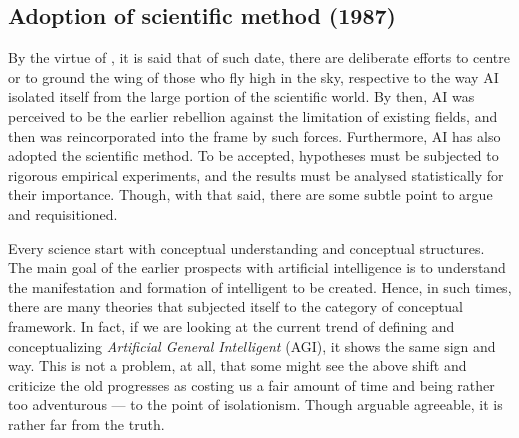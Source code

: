 \subsection{Adoption of scientific method (1987)}

By the virtue of \cite{10.5555/1671238}, it is said that of such date, there are deliberate efforts to centre or to ground the wing of those who fly high in the sky, respective to the way AI isolated itself from the large portion of the scientific world. By then, AI was perceived to be the earlier rebellion against the limitation of existing fields, and then was reincorporated into the frame by such forces. Furthermore, AI has also adopted the scientific method. To be accepted, hypotheses must be subjected to rigorous empirical experiments, and the results must be analysed statistically for their importance. Though, with that said, there are some subtle point to argue and requisitioned. 

Every science start with conceptual understanding and conceptual structures. The main goal of the earlier prospects with artificial intelligence is to understand the manifestation and formation of intelligent to be created. Hence, in such times, there are many theories that subjected itself to the category of conceptual framework. In fact, if we are looking at the current trend of defining and conceptualizing \textit{Artificial General Intelligent} (AGI), it shows the same sign and way. This is not a problem, at all, that some might see the above shift and criticize the old progresses as costing us a fair amount of time and being rather too adventurous --- to the point of isolationism. Though arguable agreeable, it is rather far from the truth. 

